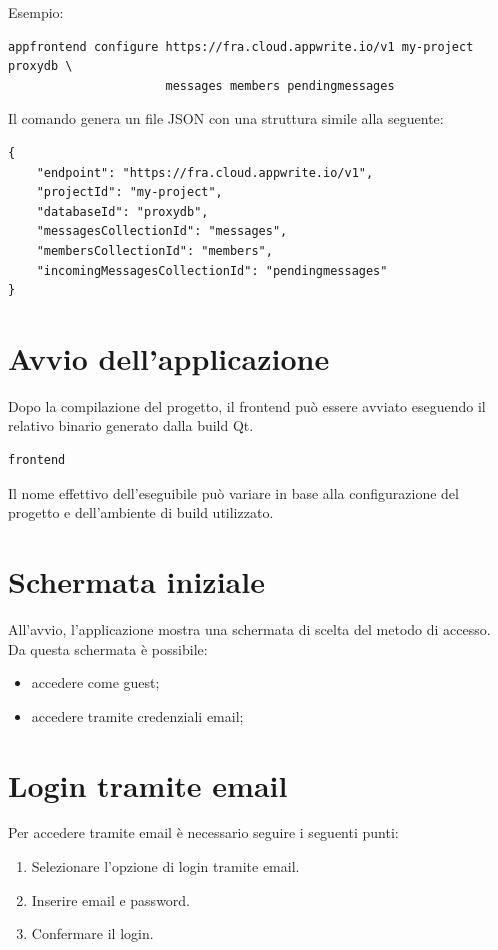 \documentclass[a4paper, 11pt, twoside]{report}
\begin{document}
\noindent Esempio:
\begin{verbatim}
appfrontend configure https://fra.cloud.appwrite.io/v1 my-project proxydb \
                      messages members pendingmessages
\end{verbatim}

\noindent Il comando genera un file JSON con una struttura simile alla seguente:
\begin{verbatim}
{
    "endpoint": "https://fra.cloud.appwrite.io/v1",
    "projectId": "my-project",
    "databaseId": "proxydb",
    "messagesCollectionId": "messages",
    "membersCollectionId": "members",
    "incomingMessagesCollectionId": "pendingmessages"
}
\end{verbatim}

\section{Avvio dell'applicazione}

\noindent Dopo la compilazione del progetto, il frontend può essere avviato eseguendo il relativo binario generato dalla build Qt.

\begin{verbatim}
frontend
\end{verbatim}

\noindent Il nome effettivo dell'eseguibile può variare in base alla configurazione del progetto e dell'ambiente di build utilizzato.

\section{Schermata iniziale}

All'avvio, l'applicazione mostra una schermata di scelta del metodo di accesso. Da questa schermata è possibile:

\begin{itemize}
    \item accedere come guest;
    \item accedere tramite credenziali email;
\end{itemize}

\section{Login tramite email}

\noindent Per accedere tramite email è necessario seguire i seguenti punti:

\begin{enumerate}
    \item Selezionare l'opzione di login tramite email.
    \item Inserire email e password.
    \item Confermare il login.
\end{enumerate}
\end{document}
